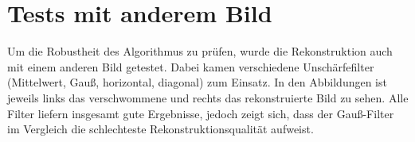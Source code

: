 \section{Tests mit anderem Bild}

Um die Robustheit des Algorithmus zu prüfen, wurde die Rekonstruktion auch mit einem anderen Bild getestet. Dabei kamen verschiedene Unschärfefilter (Mittelwert, Gauß, horizontal, diagonal) zum Einsatz. In den Abbildungen ist jeweils links das verschwommene und rechts das rekonstruierte Bild zu sehen. Alle Filter liefern insgesamt gute Ergebnisse, jedoch zeigt sich, dass der Gauß-Filter im Vergleich die schlechteste Rekonstruktionsqualität aufweist.

\noindent
\begin{minipage}[t]{0.5\textwidth}
\end{minipage}
%
\begin{minipage}[t]{0.5\textwidth}
\end{minipage}

\noindent
\begin{minipage}[t]{0.5\textwidth}
\end{minipage}
%
\begin{minipage}[t]{0.5\textwidth}
\end{minipage}

\noindent
\begin{minipage}[t]{0.5\textwidth}
\end{minipage}
%
\begin{minipage}[t]{0.5\textwidth}
\end{minipage}

\noindent
\begin{minipage}[t]{0.5\textwidth}
\end{minipage}
%
\begin{minipage}[t]{0.5\textwidth}
\end{minipage}





